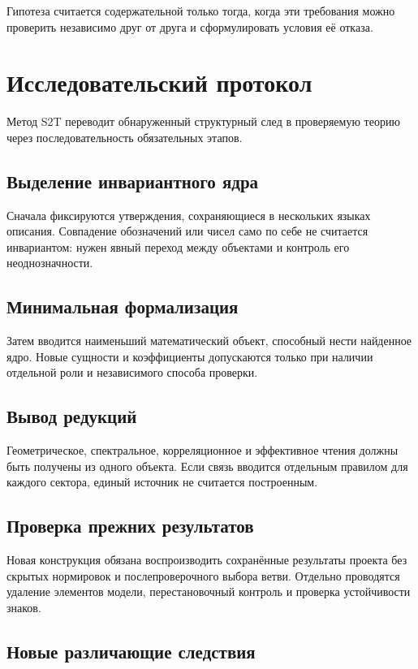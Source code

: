 Гипотеза считается содержательной только тогда, когда эти требования можно
проверить независимо друг от друга и сформулировать условия её отказа.

\chapter{Исследовательский протокол}

Метод S2T переводит обнаруженный структурный след в проверяемую теорию через
последовательность обязательных этапов.

\section{Выделение инвариантного ядра}

Сначала фиксируются утверждения, сохраняющиеся в нескольких языках описания.
Совпадение обозначений или чисел само по себе не считается инвариантом: нужен
явный переход между объектами и контроль его неоднозначности.

\section{Минимальная формализация}

Затем вводится наименьший математический объект, способный нести найденное
ядро. Новые сущности и коэффициенты допускаются только при наличии отдельной
роли и независимого способа проверки.

\section{Вывод редукций}

Геометрическое, спектральное, корреляционное и эффективное чтения должны быть
получены из одного объекта. Если связь вводится отдельным правилом для каждого
сектора, единый источник не считается построенным.

\section{Проверка прежних результатов}

Новая конструкция обязана воспроизводить сохранённые результаты проекта без
скрытых нормировок и послепроверочного выбора ветви. Отдельно проводятся
удаление элементов модели, перестановочный контроль и проверка устойчивости
знаков.

\section{Новые различающие следствия}

